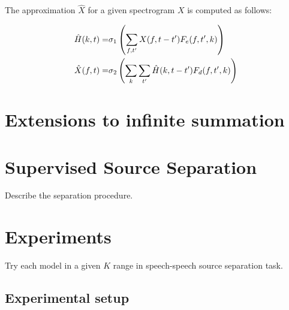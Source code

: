 \documentclass{article}
\begin{document}
The approximation $\hat X$ for a given spectrogram $X$ is computed as follows: 

\begin{align}
	\hat H(k,t) =& \sigma_1\left ( \sum_{f,t'} X(f,t-t') F_e(f,t',k) \right ) \notag \\
	\hat X(f,t) =& \sigma_2 \left ( \sum_k \sum_{t'} \hat H(k,t-t') F_d(f, t',k) \right )
\end{align}



\section{Extensions to infinite summation}
\label{sec:rnncnn}







\section{Supervised Source Separation}
\label{sec:ss}
Describe the separation procedure.

\section{Experiments}
\label{sec:experiments}
Try each model in a given $K$ range in speech-speech source separation task.

\subsection{Experimental setup}
\label{subsec:setup}
\end{document}
